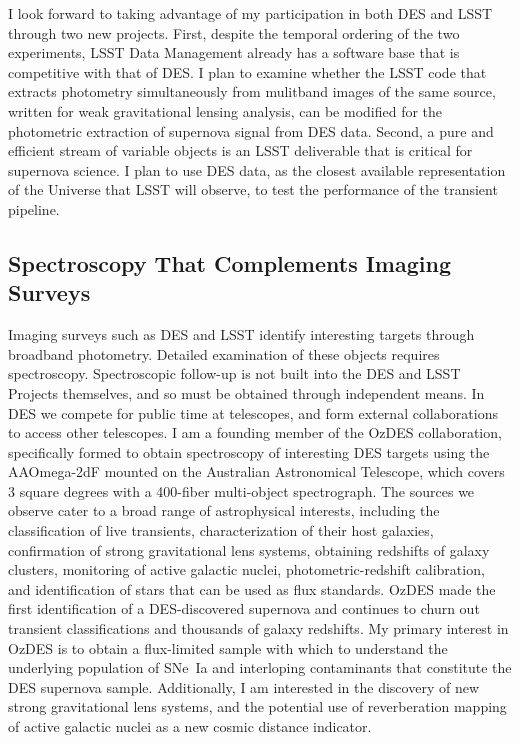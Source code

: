 \documentclass[12pt]{article}
\begin{document}
I look forward to taking advantage of my participation in both DES and LSST through two new projects.
First, despite the temporal ordering of the two experiments,  LSST Data Management 
already has a software base that is competitive with that of DES.  I plan to examine whether the LSST code that extracts photometry simultaneously from mulitband images
of the same source, written for weak gravitational lensing analysis, can be modified for the photometric extraction of supernova signal from DES data.
Second,  a pure and efficient stream of variable objects is an LSST  deliverable that is critical for supernova science.
I plan to use
DES data, as the closest available representation of the Universe that LSST will observe, to test the performance
of the transient pipeline.

\subsection{Spectroscopy That Complements Imaging Surveys}
Imaging surveys such as DES and LSST identify interesting targets through broadband photometry.
Detailed examination of these objects requires spectroscopy. Spectroscopic follow-up is not
built into the DES and LSST Projects themselves, and so must be obtained through independent means.
In DES we compete for public time at
telescopes, and form external collaborations to access other telescopes.  I am a founding member of the OzDES collaboration, specifically formed to obtain spectroscopy
of interesting DES targets using the AAOmega-2dF mounted on the Australian Astronomical Telescope, which
covers 3 square degrees with a 400-fiber multi-object spectrograph.
The sources we observe cater to a broad range of astrophysical interests,
including the classification of live transients, characterization of their host galaxies, confirmation
of strong gravitational lens systems, obtaining redshifts of galaxy clusters, monitoring of active galactic nuclei, photometric-redshift
calibration,
and identification of stars that can be used as
flux standards.  OzDES  made the first identification of a DES-discovered supernova \cite{2013ATel.5568....1C} and continues to churn out transient classifications and thousands of galaxy 
redshifts. My primary interest in OzDES is to obtain a flux-limited sample with which to understand the
underlying population of SNe~Ia  \cite{2006MNRAS.370..933J} and interloping contaminants that constitute the DES supernova
sample.  
Additionally, I am interested in the discovery of new strong gravitational lens systems, and the potential use
of reverberation mapping of active galactic nuclei as a new cosmic distance indicator.
\end{document}
